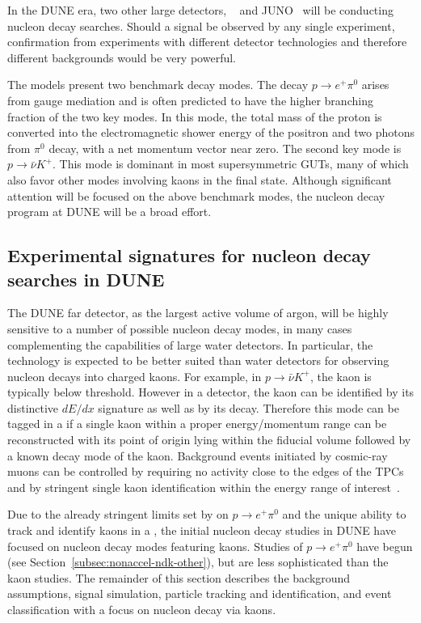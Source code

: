 In the DUNE era, two other large detectors, \hyperk~\cite{Abe:2018uyc} and JUNO~\cite{Djurcic:2015vqa} will be conducting nucleon decay searches. Should a signal be observed by any single experiment, confirmation from experiments with different detector technologies and therefore different backgrounds would be very powerful.

The models present two benchmark decay modes.  The decay $p \rightarrow e^{+}\pi^0$ arises from gauge mediation and is often predicted to have the higher branching fraction of the two key modes. In this mode, the total mass of the proton is converted into the electromagnetic shower energy of the positron and two photons from $\pi^0$ decay, with a net momentum vector near zero. 
The second key mode is $p \rightarrow \bar{\nu}K^{+}$. This mode is dominant in most supersymmetric GUTs, many of which also favor other modes involving kaons in the final state.
Although significant attention will be focused on the above benchmark modes, the nucleon decay program at DUNE will be a broad effort.

\subsection{Experimental signatures for nucleon decay searches in DUNE}
\label{subsec:nonaccel-ndk-dune}

The DUNE far detector, as the largest active volume of argon, 
will be highly sensitive to a number of possible nucleon decay modes, 
in many cases complementing the capabilities of large water detectors.
In particular, the \lartpc technology is expected to be better suited than water detectors for observing nucleon decays into charged kaons.  For example, in $p \rightarrow \bar{\nu}K^{+}$, the kaon is typically below \cherenkov threshold.  However in a \lartpc detector, the kaon can be identified by its distinctive $dE/dx$ signature as well as by its decay.  Therefore this mode can be tagged in a \lartpc if a single kaon within a proper energy/momentum range can be reconstructed with its point of origin lying within the fiducial volume followed by a known decay mode of the kaon.
Background events initiated by cosmic-ray muons can be controlled  by requiring no activity close to the edges of the TPCs and by stringent single kaon identification within the energy range of interest~\cite{bib:docdb3384,bib:docdb1752}.

Due to the already stringent limits set by \superk on $p \rightarrow e^{+}\pi^0$ and the unique ability to track and identify kaons in a \lartpc, the initial nucleon decay studies in DUNE have focused on nucleon decay modes featuring kaons.  Studies of $p \rightarrow e^{+}\pi^0$ have begun (see Section~\ref{subsec:nonaccel-ndk-other}), but are less sophisticated than the kaon studies.  The remainder of this section describes the background assumptions, signal simulation, particle tracking and identification, and event classification with a focus on nucleon decay via kaons.

